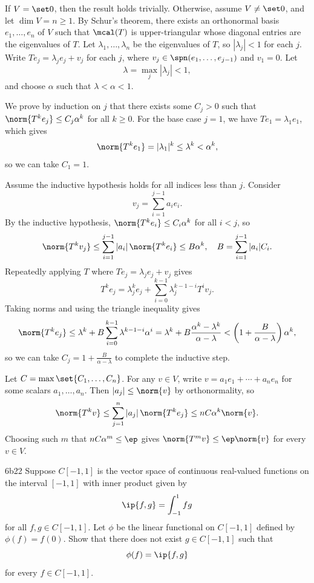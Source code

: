 \begin{sol}
    If $V = \set 0$, then the result holds trivially.
    Otherwise, assume $V \neq \set 0$, and let $\dim V = n \geq 1$.
    By Schur's theorem, there exists an orthonormal basis $e_1, \ldots, e_n$ of $V$ such that $\mcal(T)$ is upper-triangular whose diagonal entries are the eigenvalues of $T$.
    Let $\lambda_1, \ldots, \lambda_n$ be the eigenvalues of $T$, so $|\lambda_j| < 1$ for each $j$.
    Write $Te_j = \lambda_j e_j + v_j$ for each $j$, where $v_j \in \spn(e_1, \ldots, e_{j-1})$ and $v_1 = 0$.
    Let
    \[
        \lambda = \max_j |\lambda_j| < 1,
    \]
    and choose $\alpha$ such that $\lambda < \alpha < 1$.

    We prove by induction on $j$ that there exists some $C_j > 0$ such that $\norm{T^k e_j} \leq C_j \alpha^k$ for all $k \geq 0$.
    For the base case $j = 1$, we have $Te_1 = \lambda_1 e_1$, which gives
    \[
        \norm{T^k e_1} = |\lambda_1|^k \leq \lambda^k < \alpha^k,
    \]
    so we can take $C_1 = 1$.

    Assume the inductive hypothesis holds for all indices less than $j$.
    Consider
    \[
        v_j = \sum_{i=1}^{j-1}a_i e_i.
    \]
    By the inductive hypothesis, $\norm{T^k e_i} \leq C_i \alpha^k$ for all $i < j$, so
    \[
        \norm{T^k v_j} \leq \sum_{i=1}^{j-1} |a_i|\,\norm{T^k e_i} \leq B\alpha^k, \quad B = \sum_{i=1}^{j-1} |a_i|C_i.
    \]
    Repeatedly applying $T$ where $Te_j = \lambda_j e_j + v_j$ gives
    \[
        T^k e_j = \lambda_j^k e_j + \sum_{i=0}^{k-1} \lambda_j^{k-1-i} T^i v_j.
    \]
    Taking norms and using the triangle inequality gives
    \[
        \norm{T^k e_j} \leq \lambda^k + B\sum_{i=0}^{k-1} \lambda^{k-1-i}\alpha^i = \lambda^k + B\frac{\alpha^k - \lambda^k}{\alpha - \lambda} < \left(1 + \frac{B}{\alpha - \lambda}\right)\alpha^k,
    \]
    so we can take $C_j = 1 + \frac{B}{\alpha - \lambda}$ to complete the inductive step.

    Let $C = \max\set{C_1, \ldots, C_n}$.
    For any $v \in V$, write $v = a_1 e_1 + \cdots + a_n e_n$ for some scalars $a_1, \ldots, a_n$.
    Then $|a_j| \leq \norm{v}$ by orthonormality, so
    \[
        \norm{T^k v} \leq \sum_{j=1}^{n} |a_j|\,\norm{T^k e_j} \leq nC\alpha^k\norm{v}.
    \]
    Choosing such $m$ that $nC\alpha^m \leq \ep$ gives $\norm{T^m v} \leq \ep\norm{v}$ for every $v \in V$.
\end{sol}

\begin{exercise}{6b22}
    Suppose $C[-1, 1]$ is the vector space of continuous real-valued functions on the interval $[-1, 1]$ with inner product given by
    \[
        \ip{f, g} = \int_{-1}^{1} fg
    \]
    for all $f, g \in C[-1, 1]$.
    Let $\phi$ be the linear functional on $C[-1, 1]$ defined by $\phi(f) = f(0)$.
    Show that there does not exist $g \in C[-1, 1]$ such that
    \[
        \phi(f) = \ip{f, g}
    \]
    for every $f \in C[-1, 1]$.

\end{exercise}

